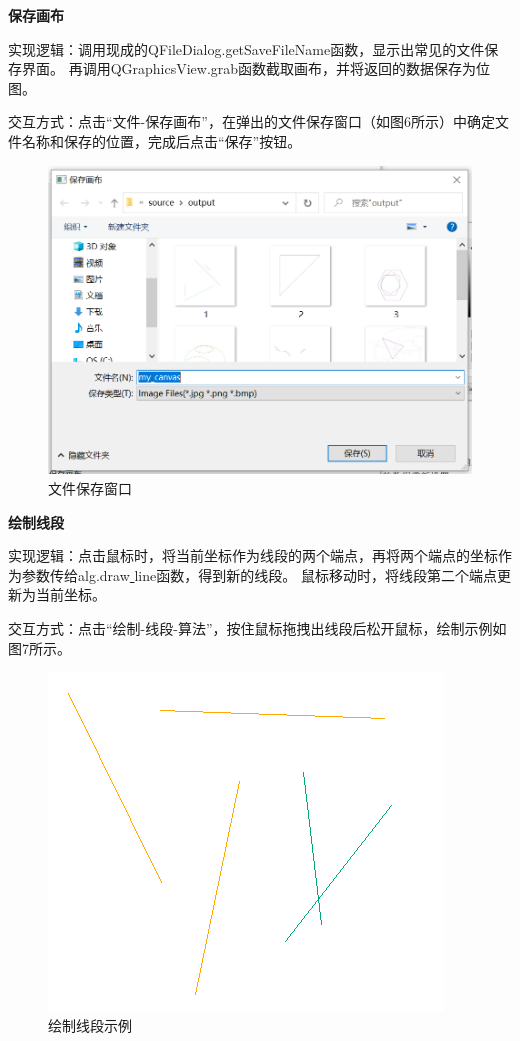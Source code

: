 \documentclass[a4paper,UTF8]{article}
\theoremstyle{definition}
\begin{document}
\textbf{保存画布}

实现逻辑：调用现成的QFileDialog.getSaveFileName函数，显示出常见的文件保存界面。
再调用QGraphicsView.grab函数截取画布，并将返回的数据保存为位图。

交互方式：点击“文件-保存画布”，在弹出的文件保存窗口（如图6所示）中确定文件名称和保存的位置，完成后点击“保存”按钮。
\begin{figure}[H]
    \centering
    \includegraphics[scale=0.6]{save-canvas.PNG}
    \caption{文件保存窗口}
\end{figure}

\textbf{绘制线段}

实现逻辑：点击鼠标时，将当前坐标作为线段的两个端点，再将两个端点的坐标作为参数传给alg.draw\underline{ }line函数，得到新的线段。
鼠标移动时，将线段第二个端点更新为当前坐标。

交互方式：点击“绘制-线段-算法”，按住鼠标拖拽出线段后松开鼠标，绘制示例如图7所示。
\begin{figure}[H]
    \centering
    \includegraphics[scale=0.75]{draw-line.PNG}
    \caption{绘制线段示例}
\end{figure}
\end{document}
